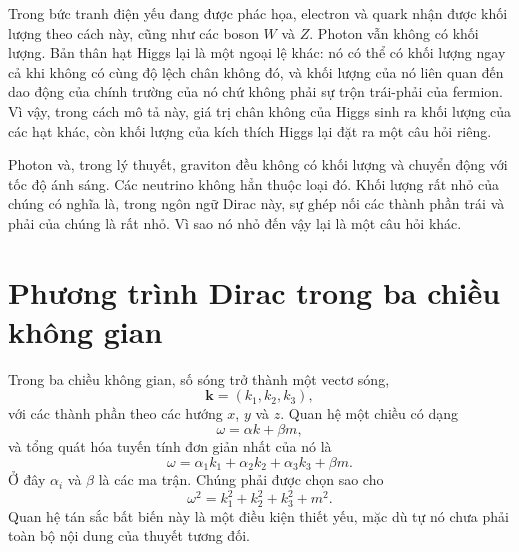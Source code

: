 Trong bức tranh điện yếu đang được phác họa, electron và quark nhận được khối lượng theo cách này, cũng như các boson \(W\) và \(Z\). Photon vẫn không có khối lượng. Bản thân hạt Higgs lại là một ngoại lệ khác: nó có thể có khối lượng ngay cả khi không có cùng độ lệch chân không đó, và khối lượng của nó liên quan đến dao động của chính trường của nó chứ không phải sự trộn trái-phải của fermion. Vì vậy, trong cách mô tả này, giá trị chân không của Higgs sinh ra khối lượng của các hạt khác, còn khối lượng của kích thích Higgs lại đặt ra một câu hỏi riêng.

\begin{classroomqa}
\end{classroomqa}

Photon và, trong lý thuyết, graviton đều không có khối lượng và chuyển động với tốc độ ánh sáng. Các neutrino không hẳn thuộc loại đó. Khối lượng rất nhỏ của chúng có nghĩa là, trong ngôn ngữ Dirac này, sự ghép nối các thành phần trái và phải của chúng là rất nhỏ. Vì sao nó nhỏ đến vậy lại là một câu hỏi khác.

\section{Phương trình Dirac trong ba chiều không gian}

Trong ba chiều không gian, số sóng trở thành một vectơ sóng,
\begin{equation}
\mathbf{k}=(k_1,k_2,k_3),
\end{equation}
với các thành phần theo các hướng \(x\), \(y\) và \(z\). Quan hệ một chiều có dạng
\begin{equation}
\omega=\alpha k+\beta m,
\end{equation}
và tổng quát hóa tuyến tính đơn giản nhất của nó là
\begin{equation}
\omega
=
\alpha_1 k_1+\alpha_2 k_2+\alpha_3 k_3+\beta m.
\end{equation}
Ở đây \(\alpha_i\) và \(\beta\) là các ma trận. Chúng phải được chọn sao cho
\begin{equation}
\omega^2=k_1^2+k_2^2+k_3^2+m^2.
\end{equation}
Quan hệ tán sắc bất biến này là một điều kiện thiết yếu, mặc dù tự nó chưa phải toàn bộ nội dung của thuyết tương đối.

